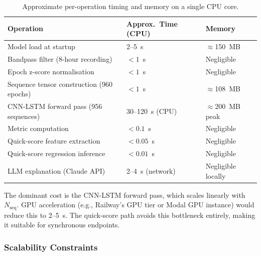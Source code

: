\documentclass[10pt]{article}
\begin{document}
\begin{table}[h]
\centering
\small
\renewcommand{\arraystretch}{1.2}
\begin{tabular}{|l|l|l|}
\hline
\textbf{Operation} & \textbf{Approx.\ Time (CPU)} & \textbf{Memory} \\\hline
Model load at startup & 2--5~s & $\approx$150~MB \\\hline
Bandpass filter (8-hour recording) & $<1$~s & Negligible \\\hline
Epoch z-score normalisation & $<1$~s & Negligible \\\hline
Sequence tensor construction (960 epochs) & $<1$~s & $\approx$108~MB \\\hline
CNN-LSTM forward pass (956 sequences) & 30--120~s (CPU) & $\approx$200~MB peak \\\hline
Metric computation & $<0.1$~s & Negligible \\\hline
Quick-score feature extraction & $<0.05$~s & Negligible \\\hline
Quick-score regression inference & $<0.01$~s & Negligible \\\hline
LLM explanation (Claude API) & 2--4~s (network) & Negligible locally \\\hline
\end{tabular}
\caption{Approximate per-operation timing and memory on a single CPU core.}
\label{tab:perf-profile}
\end{table}

The dominant cost is the CNN-LSTM forward pass, which scales linearly with $N_\text{seq}$. GPU acceleration (e.g., Railway's GPU tier or Modal GPU instance) would reduce this to 2--5~s. The quick-score path avoids this bottleneck entirely, making it suitable for synchronous endpoints.

\subsubsection{Scalability Constraints}
\label{sec:scalabilityConstraints}
\end{document}
